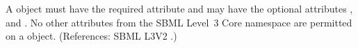 A \UnitDefinition object must have the required attribute  and
may have the optional attributes ,  and
.  No other attributes from the SBML Level~3 Core namespace are
permitted on a \UnitDefinition object.  (References: SBML L3V2
.)
